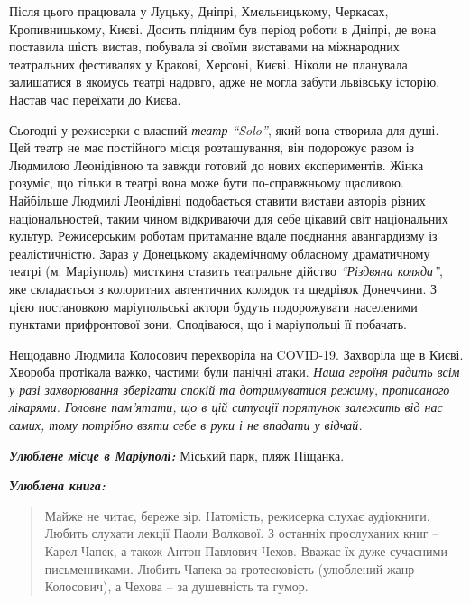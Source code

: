 Після цього працювала у Луцьку, Дніпрі, Хмельницькому, Черкасах,
Кропивницькому, Києві. Досить плідним був період роботи в Дніпрі, де вона
поставила шість вистав, побувала зі своїми виставами на міжнародних театральних
фестивалях у Кракові, Херсоні, Києві. Ніколи не планувала залишатися в якомусь
театрі надовго, адже не могла забути львівську історію. Настав час переїхати до
Києва.


Сьогодні у режисерки є власний \emph{театр \enquote{Solo}}, який вона створила для душі. Цей
театр не має постійного місця розташування, він подорожує разом із Людмилою
Леонідівною та завжди готовий до нових експериментів. Жінка розуміє, що тільки
в театрі вона може бути по-справжньому щасливою. Найбільше Людмилі Леонідівні
подобається ставити вистави авторів різних національностей, таким чином
відкриваючи для себе цікавий світ національних культур. Режисерським роботам
притаманне вдале поєднання авангардизму із реалістичністю. Зараз у Донецькому
академічному обласному драматичному театрі (м. Маріуполь) мисткиня ставить
театральне дійство \emph{\enquote{Різдвяна коляда}}, яке складається з колоритних автентичних
колядок та щедрівок Донеччини. З цією постановкою маріупольські актори будуть
подорожувати населеними пунктами прифронтової зони. Сподіваюся, що і
маріупольці її побачать.


Нещодавно Людмила Колосович перехворіла на COVID-19. Захворіла ще в Києві.
Хвороба протікала важко, частими були панічні атаки. \emph{Наша героїня радить всім у
разі захворювання зберігати спокій та дотримуватися режиму, прописаного
лікарями. Головне пам'ятати, що в цій ситуації порятунок залежить від нас
самих, тому потрібно взяти себе в руки  і не впадати у відчай.}


\emph{\textbf{Улюблене місце в Маріуполі:}} Міський парк, пляж Піщанка.

\emph{\textbf{Улюблена книга:}}

\begin{quote}
Майже не читає, береже зір. Натомість, режисерка слухає аудіокниги. Любить
слухати лекції Паоли Волкової. З останніх прослуханих книг – Карел Чапек, а
також Антон Павлович Чехов. Вважає  їх дуже сучасними письменниками. Любить
Чапека за гротесковість (улюблений жанр Колосович), а Чехова – за душевність та
гумор.
\end{quote}

